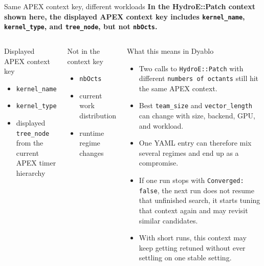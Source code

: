 \documentclass[11pt]{beamer}
\begin{document}
\begin{frame}[t]{Same APEX context key, different workloads}
\scriptsize
{\color{ceaGreen}\textbf{In the HydroE::Patch context shown here, the displayed APEX context key includes \texttt{kernel\_name}, \texttt{kernel\_type}, and \texttt{tree\_node}, but not \texttt{nbOcts}.}}

\vspace{0.18em}
\begin{columns}[T,onlytextwidth]
\begin{beamerboxesrounded}[upper=tuner title,lower=tuner body,width=\linewidth,shadow=false]{Displayed APEX context key}
\tiny
\begin{itemize}\itemsep0.18em
    \item \texttt{kernel\_name}
    \item \texttt{kernel\_type}
    \item displayed \texttt{tree\_node} from the current APEX timer hierarchy
\end{itemize}
\end{beamerboxesrounded}

\vspace{0.22em}
\begin{beamerboxesrounded}[upper=profiler title,lower=profiler body,width=\linewidth,shadow=false]{Not in the context key}
\tiny
\begin{itemize}\itemsep0.18em
    \item \texttt{nbOcts}
    \item current work distribution
    \item runtime regime changes
\end{itemize}
\end{beamerboxesrounded}

\begin{beamerboxesrounded}[upper=terminal title,lower=terminal body,width=\linewidth,shadow=false]{What this means in Dyablo}
\tiny
\begin{itemize}\itemsep0.2em
    \item Two calls to \texttt{HydroE::Patch} with different \texttt{numbers of octants} still hit the same APEX context.
    \item Best \textcolor{green!70!black}{\texttt{team\_size}} and \textcolor{green!70!black}{\texttt{vector\_length}} can change with size, backend, GPU, and workload.
    \item One YAML entry can therefore mix several regimes and end up as a compromise.
    \item If one run stops with \texttt{Converged: false}, the next run does not resume that unfinished search, it starts tuning that context again and may revisit similar candidates.
    \item With short runs, this context may keep getting retuned without ever settling on one stable setting.
\end{itemize}
\end{beamerboxesrounded}
\end{columns}
\end{frame}
\end{document}
